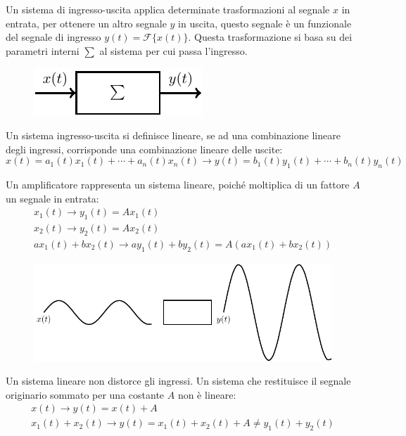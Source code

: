 \documentclass{article}
\numberwithin{equation}{subsection}
\begin{document}
Un sistema di ingresso-uscita applica determinate trasformazioni al segnale $x$ in entrata, per ottenere un altro segnale $y$ in uscita, questo segnale è un funzionale 
del segnale di ingresso $y(t)=\mathcal{F}\{x(t)\}$. Questa trasformazione si basa su dei parametri interni $\sum$ al sistema per cui passa l'ingresso. 
\begin{figure}[H]%
    \centering
    \includegraphics{sistema-io.pdf}%
\end{figure}

Un sistema ingresso-uscita si definisce lineare, se ad una combinazione lineare degli ingressi, corrisponde una combinazione lineare delle uscite:
\begin{equation*}
    x(t)=a_1(t)x_1(t)+\cdots+a_n(t)x_n(t)\to y(t)=b_1(t)y_1(t)+\cdots+b_n(t)y_n(t)
\end{equation*}

Un amplificatore rappresenta un sistema lineare, poiché moltiplica di un fattore $A$ un segnale in entrata:
\begin{gather*}
    x_1(t)\to y_1(t)=Ax_1(t)\\
    x_2(t)\to y_2(t)=Ax_2(t)\\
    ax_1(t)+bx_2(t)\to ay_1(t)+by_2(t)=A(ax_1(t)+bx_2(t))
\end{gather*} 
\begin{figure}[H]%
    \centering
    \includegraphics{amplificatore.pdf}%
\end{figure}
Un sistema lineare non distorce gli ingressi. Un sistema che restituisce il segnale originario sommato per una costante $A$ non è lineare:
\begin{gather*}
    x(t)\to y(t)=x(t)+A\\
    x_1(t)+x_2(t)\to y(t)=x_1(t)+x_2(t)+A\neq y_1(t)+y_2(t)
\end{gather*}
\end{document}
